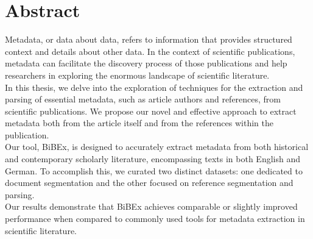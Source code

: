 \chapter*{Abstract}
Metadata, or data about data, refers to information that provides structured context and details about other data. In the context of scientific publications, metadata can facilitate the discovery process of those publications and help researchers in exploring the enormous landscape of scientific literature.\\
In this thesis, we delve into the exploration of techniques for the extraction and parsing of essential metadata, such as article authors and references, from scientific publications. We propose our novel and effective approach to extract metadata both from the article itself and from the references within the publication.\\
Our tool, BiBEx, is designed to accurately extract metadata from both historical and contemporary scholarly literature, encompassing texts in both English and German. To accomplish this, we curated two distinct datasets: one dedicated to document segmentation and the other focused on reference segmentation and parsing.\\
Our results demonstrate that BiBEx achieves comparable or slightly improved performance when compared to commonly used tools for metadata extraction in scientific literature.